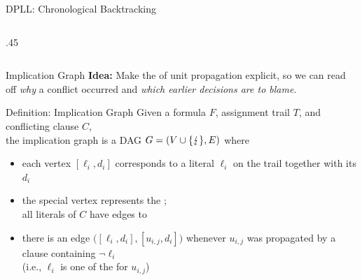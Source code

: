 \documentclass[t]{sdqbeamer}
\begin{document}
\begin{frame}{DPLL: Chronological Backtracking}
\begin{columns}[T]
\begin{column}{.45\textwidth}
\end{column}
\end{columns}
\end{frame}


\begin{frame}{Implication Graph}
\textbf{Idea:} Make the  of unit propagation explicit, so we can read off \emph{why} a conflict occurred and \emph{which earlier decisions are to blame}.\\[1em]
\begin{blueblock}{Definition: Implication Graph}
Given a formula $F$, assignment trail $T$, and conflicting clause $C$,\\
the implication graph is a DAG $G=(V \cup \{ \text{\ensuremath{\lightning}} \},E)$ where\\[1ex]
\begin{itemize}\setlength{\itemsep}{0.8em}
	\item each vertex $[\ell_i, d_i]$ corresponds to a literal $\ell_i$ on the trail together with its  $d_i$
	\item the special vertex \blitz{} represents the ;\\[1ex]
	all literals of $C$ have edges to \blitz{}
	\item there is an edge $\bigl([\ell_i, d_i], [u_{i,j}, d_i]\bigr)$ whenever $u_{i,j}$ was propagated by a clause containing $\lnot\ell_i$\\[1ex] (i.e., $\ell_i$ is one of the  for $u_{i,j}$)
\end{itemize}
\end{blueblock}
\end{frame}
\end{document}

